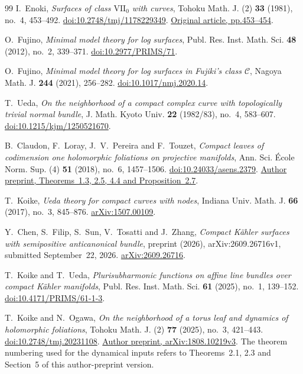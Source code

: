 \documentclass[11pt]{amsart}
\theoremstyle{definition}
\theoremstyle{remark}
\numberwithin{equation}{section}
\begin{document}
\begin{thebibliography}{99}
I.~Enoki, \emph{Surfaces of class $\mathrm{VII}_0$ with curves}, Tohoku Math. J. (2)
\textbf{33} (1981), no.~4, 453--492.
\href{https://doi.org/10.2748/tmj/1178229349}{doi:10.2748/tmj/1178229349}.
\href{https://www.jstage.jst.go.jp/article/tmj1949/33/4/33_4_453/_pdf/-char/en}{Original article, pp.453--454}.

O.~Fujino,
\emph{Minimal model theory for log surfaces},
Publ. Res. Inst. Math. Sci. \textbf{48} (2012), no.~2, 339--371.
\href{https://doi.org/10.2977/PRIMS/71}{doi:10.2977/PRIMS/71}.

O.~Fujino,
\emph{Minimal model theory for log surfaces in Fujiki's class $\mathcal C$},
Nagoya Math. J. \textbf{244} (2021), 256--282.
\href{https://doi.org/10.1017/nmj.2020.14}{doi:10.1017/nmj.2020.14}.

T.~Ueda,
\emph{On the neighborhood of a compact complex curve with topologically
trivial normal bundle},
J. Math. Kyoto Univ. \textbf{22} (1982/83), no.~4, 583--607.
\href{https://doi.org/10.1215/kjm/1250521670}{doi:10.1215/kjm/1250521670}.

B.~Claudon, F.~Loray, J.~V.~Pereira and F.~Touzet,
\emph{Compact leaves of codimension one holomorphic foliations on
projective manifolds},
Ann. Sci. \'Ecole Norm. Sup. (4) \textbf{51} (2018), no.~6, 1457--1506.
\href{https://doi.org/10.24033/asens.2379}{doi:10.24033/asens.2379}.
\href{https://arxiv.org/abs/1512.06623}{Author preprint, Theorems~1.3, 2.5, 4.4 and Proposition~2.7}.

T.~Koike,
\emph{Ueda theory for compact curves with nodes},
Indiana Univ. Math. J. \textbf{66} (2017), no.~3, 845--876.
\href{https://arxiv.org/abs/1507.00109}{arXiv:1507.00109}.

Y.~Chen, S.~Filip, S.~Sun, V.~Tosatti and J.~Zhang,
\emph{Compact K\"ahler surfaces with semipositive anticanonical bundle},
preprint (2026), arXiv:2609.26716v1, submitted September~22, 2026.
\href{https://arxiv.org/abs/2609.26716v1}{arXiv:2609.26716}.

T.~Koike and T.~Ueda,
\emph{Plurisubharmonic functions on affine line bundles over compact
K\"ahler manifolds},
Publ. Res. Inst. Math. Sci. \textbf{61} (2025), no.~1, 139--152.
\href{https://doi.org/10.4171/PRIMS/61-1-3}{doi:10.4171/PRIMS/61-1-3}.



T.~Koike and N.~Ogawa,
\emph{On the neighborhood of a torus leaf and dynamics of holomorphic foliations},
Tohoku Math. J. (2) \textbf{77} (2025), no.~3, 421--443.
\href{https://doi.org/10.2748/tmj.20231108}{doi:10.2748/tmj.20231108}.
\href{https://arxiv.org/abs/1808.10219v3}{Author preprint, arXiv:1808.10219v3}.
The theorem numbering used for the dynamical inputs refers to
Theorems~2.1, 2.3 and Section~5 of this author-preprint version.


\end{thebibliography}
\end{document}
